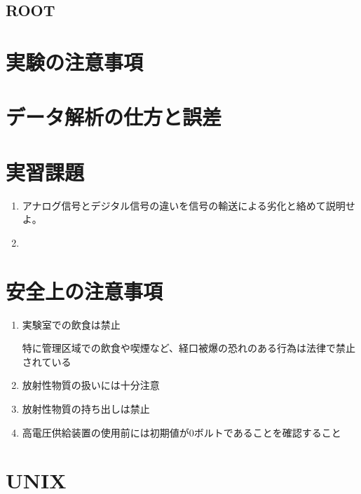 \documentclass{jarticle}
\begin{document}
  
  	  \subsection{ROOT}
	  
 	  \section{実験の注意事項}
	  
 \section{データ解析の仕方と誤差}
 
 
 	  \section{実習課題}

 	  \begin{enumerate}
	   \item アナログ信号とデジタル信号の違いを信号の輸送による劣化と絡めて説明せよ。
		 
	   \item 
	  \end{enumerate}
	  
	  
	  
 \section{安全上の注意事項}
 	  \begin{enumerate}
	   \item 実験室での飲食は禁止
		 
		 特に管理区域での飲食や喫煙など、経口被爆の恐れのある行為は法律で禁止されている
		 
	   \item 放射性物質の扱いには十分注意

	   \item 放射性物質の持ち出しは禁止

	   \item 高電圧供給装置の使用前には初期値が0ボルトであることを確認すること
		 
		
	  \end{enumerate}
	  

	  
	  
	  
\clearpage

\appendix 
	  
	  
 \section{UNIX}
	  
\end{document}
